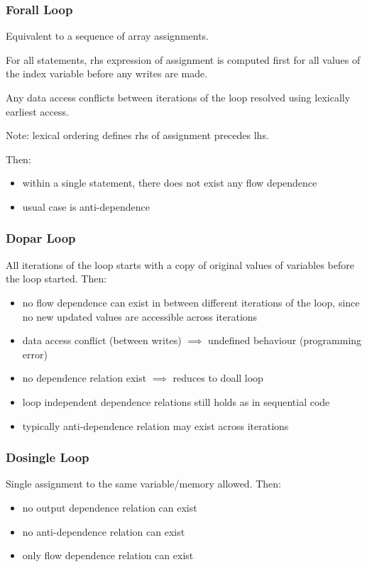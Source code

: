 \documentclass[8pt]{extarticle}
\begin{document}
\begin{multicols*}{2}
  \subsubsection{Forall Loop}

  Equivalent to a sequence of array assignments.
  
  For all statements, rhs expression of assignment is computed first for all values of the index variable before any writes are made.

  Any data access conflicts between iterations of the loop resolved using lexically earliest access.

  Note: lexical ordering defines rhs of assignment precedes lhs.

  Then:
  \begin{itemize}
  \item within a single statement, there does not exist any flow dependence
  \item usual case is anti-dependence
  \end{itemize}
  
  \subsubsection{Dopar Loop}
  All iterations of the loop starts with a copy of original values of variables before the loop started. Then:
  \begin{itemize}
  \item no flow dependence can exist in between different iterations of the loop, since no new updated values are accessible across iterations
  \item data access conflict (between writes) $\implies$ undefined behaviour (programming error)
  \item no dependence relation exist $\implies$ reduces to doall loop
  \item loop independent dependence relations still holds as in sequential code
  \item typically anti-dependence relation may exist across iterations
  \end{itemize}
  
  \subsubsection{Dosingle Loop}
  Single assignment to the same variable/memory allowed. Then:
  \begin{itemize}
  \item no output dependence relation can exist
  \item no anti-dependence relation can exist
  \item only flow dependence relation can exist
  \end{itemize}


\end{multicols*}
\end{document}
